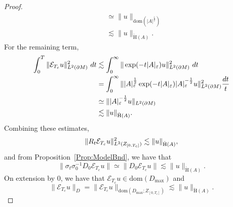 \documentclass[a4paper,10pt,reqno]{amsart}
\newcommand{\modulus}[1]{|#1|}
\newcommand{\norm}[1]{\| #1 \|}%
\newcommand{\Lp}[2][{}]{{\rm L}^{#2}_{\rm #1}}%
\newcommand{\checkH}{\check{\mathrm{H}}}
\newcommand{\dom}{\mathrm{dom}}
\newcommand{\ext}{\mathcal{E}}
\renewcommand{\epsilon}{\varepsilon}
\newcommand{\dM}{\partial M}
\theoremstyle{definition}
\begin{document}
\begin{proof}
\begin{align*}
 & \simeq\norm{u}_{\dom(\modulus{A}^{\frac12})}                                                                                      \\
 & \lesssim \norm{u}_{\checkH(A)}.
\end{align*}
For the remaining term,
\begin{align*}
\int_{0}^T \norm{\ext_{T_c} u}_{\Lp{2}(\dM)}^2\ dt
 & \lesssim \int_{0}^\infty \norm{\exp(-t\modulus{A}_{\epsilon}) u}_{\Lp{2}(\dM)}^2\ dt                                                                        \\
 & =  \int_{0}^\infty \norm{\modulus{A}^{\frac12}_{\epsilon} \exp(-t\modulus{A}_{\epsilon})  \modulus{A}_{\epsilon}^{-\frac12} u}_{\Lp{2}(\dM)}^2 \frac{dt}{t} \\
 & \simeq \norm{\modulus{A}_{\epsilon}^{-\frac12} u}_{\Lp{2}(\dM)}                                                                                             \\
 & \lesssim \norm{u}_{\checkH(A)}.
\end{align*}
Combining these estimates,
$$
\norm{R_t \ext_{T_c} u}_{\Lp{2}(Z_{[0,T_c]})}^2 \lesssim \norm{u}_{\checkH(A)},$$
and from Proposition~\ref{Prop:ModelBnd}, we have that
$$\norm{\sigma_t \sigma_0^{-1} D_0 \ext_{T_c} u} \simeq \norm{D_0 \ext_{T_c} u} \lesssim \norm{u}_{\checkH(A)}.$$
On extension by $0$, we have that  $\ext_{T_c} u \in \dom(D_{\max})$ and
$$ \norm{\ext_{T_c}u}_{D} = \norm{\ext_{T_c}u}_{\dom(D_{\max};Z_{[0,T_c]})} \lesssim \norm{u}_{\checkH(A)}.$$



\end{proof}
\end{document}
